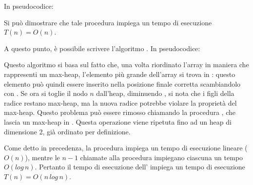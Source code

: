 In pseudocodice:


Si può dimostrare che tale procedura impiega un tempo di esecuzione \(T(n)=O(n)\).

\vspace*{10pt}

A questo punto, è possibile scrivere l'algoritmo . In pseudocodice:



Questo algoritmo si basa sul fatto che, una volta riordinato l'array in maniera che rappresenti un max-heap, l'elemento più grande dell'array si trova in : questo elemento può quindi essere inserito nella posizione finale corretta scambiandolo con . Se ora si toglie il nodo \(n\) dall'heap, diminuendo , si nota che i figli della radice restano max-heap, ma la nuova radice potrebbe violare la proprietà del max-heap. Questo problema può essere rimosso chiamando la procedura , che lascia un max-heap in . Questa operazione viene ripetuta fino ad un heap di dimensione 2, già ordinato per definizione. 

Come detto in precedenza, la procedura  impiega un tempo di esecuzione lineare (\(O(n)\)), mentre le \(n-1\) chiamate alla procedura  impiegano ciascuna un tempo \(O(log\,n)\). Pertanto il tempo di esecuzione dell' impiega un tempo di esecuzione \(T(n)=O(n\,log\,n)\).


